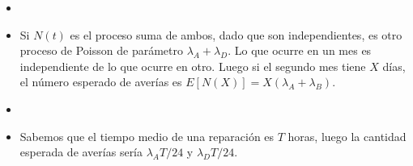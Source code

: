 \documentclass[twoside]{article}
\begin{document}
\begin{solucion}
\begin{itemize}
\item[] 
\item Si $N(t)$ es el proceso suma de ambos, dado que son independientes, es otro proceso de Poisson de parámetro $\lambda_A+\lambda_D$. Lo que ocurre en un mes es independiente de lo que ocurre en otro. Luego si el segundo mes tiene $X$ días, el número esperado de averías es $E[N(X)] = X(\lambda_A+\lambda_B)$.
\item 
\item Sabemos que el tiempo medio de una reparación es $T$ horas, luego la cantidad esperada de averías sería $\lambda_A T/24$ y $\lambda_D T/24$.
\end{itemize}
\end{solucion}
\end{document}
